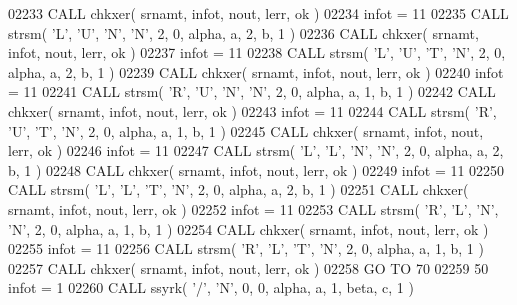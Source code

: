 \begin{DoxyCode}
02233       \textcolor{keyword}{CALL }chkxer( srnamt, infot, nout, lerr, ok )
02234       infot = 11
02235       \textcolor{keyword}{CALL }strsm( \textcolor{stringliteral}{'L'}, \textcolor{stringliteral}{'U'}, \textcolor{stringliteral}{'N'}, \textcolor{stringliteral}{'N'}, 2, 0, alpha, a, 2, b, 1 )
02236       \textcolor{keyword}{CALL }chkxer( srnamt, infot, nout, lerr, ok )
02237       infot = 11
02238       \textcolor{keyword}{CALL }strsm( \textcolor{stringliteral}{'L'}, \textcolor{stringliteral}{'U'}, \textcolor{stringliteral}{'T'}, \textcolor{stringliteral}{'N'}, 2, 0, alpha, a, 2, b, 1 )
02239       \textcolor{keyword}{CALL }chkxer( srnamt, infot, nout, lerr, ok )
02240       infot = 11
02241       \textcolor{keyword}{CALL }strsm( \textcolor{stringliteral}{'R'}, \textcolor{stringliteral}{'U'}, \textcolor{stringliteral}{'N'}, \textcolor{stringliteral}{'N'}, 2, 0, alpha, a, 1, b, 1 )
02242       \textcolor{keyword}{CALL }chkxer( srnamt, infot, nout, lerr, ok )
02243       infot = 11
02244       \textcolor{keyword}{CALL }strsm( \textcolor{stringliteral}{'R'}, \textcolor{stringliteral}{'U'}, \textcolor{stringliteral}{'T'}, \textcolor{stringliteral}{'N'}, 2, 0, alpha, a, 1, b, 1 )
02245       \textcolor{keyword}{CALL }chkxer( srnamt, infot, nout, lerr, ok )
02246       infot = 11
02247       \textcolor{keyword}{CALL }strsm( \textcolor{stringliteral}{'L'}, \textcolor{stringliteral}{'L'}, \textcolor{stringliteral}{'N'}, \textcolor{stringliteral}{'N'}, 2, 0, alpha, a, 2, b, 1 )
02248       \textcolor{keyword}{CALL }chkxer( srnamt, infot, nout, lerr, ok )
02249       infot = 11
02250       \textcolor{keyword}{CALL }strsm( \textcolor{stringliteral}{'L'}, \textcolor{stringliteral}{'L'}, \textcolor{stringliteral}{'T'}, \textcolor{stringliteral}{'N'}, 2, 0, alpha, a, 2, b, 1 )
02251       \textcolor{keyword}{CALL }chkxer( srnamt, infot, nout, lerr, ok )
02252       infot = 11
02253       \textcolor{keyword}{CALL }strsm( \textcolor{stringliteral}{'R'}, \textcolor{stringliteral}{'L'}, \textcolor{stringliteral}{'N'}, \textcolor{stringliteral}{'N'}, 2, 0, alpha, a, 1, b, 1 )
02254       \textcolor{keyword}{CALL }chkxer( srnamt, infot, nout, lerr, ok )
02255       infot = 11
02256       \textcolor{keyword}{CALL }strsm( \textcolor{stringliteral}{'R'}, \textcolor{stringliteral}{'L'}, \textcolor{stringliteral}{'T'}, \textcolor{stringliteral}{'N'}, 2, 0, alpha, a, 1, b, 1 )
02257       \textcolor{keyword}{CALL }chkxer( srnamt, infot, nout, lerr, ok )
02258       \textcolor{keywordflow}{GO TO} 70
02259    50 infot = 1
02260       \textcolor{keyword}{CALL }ssyrk( \textcolor{stringliteral}{'/'}, \textcolor{stringliteral}{'N'}, 0, 0, alpha, a, 1, beta, c, 1 )

\end{DoxyCode}

